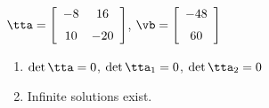 {$\tta = \left[ \begin {array}{cc} -8&16\\\noalign{\medskip}10&-20\end {array}
 \right]$,
 \quad
$\vb = \left[ \begin {array}{c} -48\\\noalign{\medskip}60\end {array}
 \right]$}
{\begin{enumerate}
\item	$\det{\tta} = 0$, $\det{\tta_1} = 0$, $\det{\tta_2} = 0$
\item Infinite solutions exist.
\end{enumerate}
}
 


